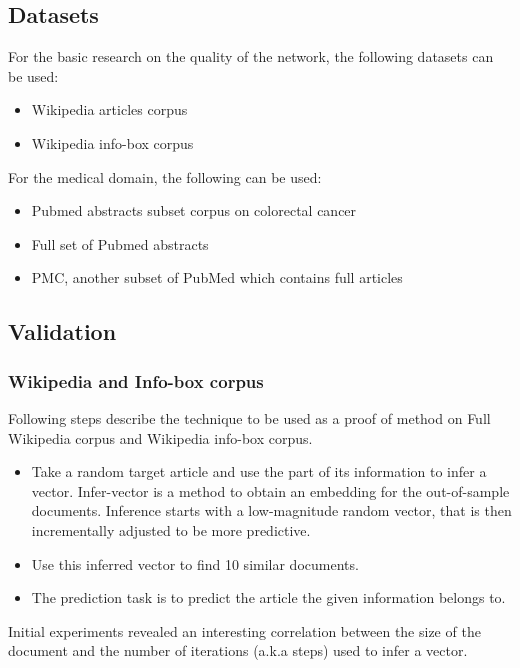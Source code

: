 \documentclass[12pt,a4paper] {article}
\begin{document}
	
	\subsection*{Datasets}
	For the basic research on the quality of the network, the following datasets can 
	be used:
	\begin{itemize}
		\item Wikipedia articles corpus
		\item Wikipedia info-box corpus
	\end{itemize}
	
	For the medical domain, the following can be used:
	\begin{itemize}
		\item Pubmed abstracts subset corpus on colorectal cancer
		\item Full set of Pubmed abstracts
		\item PMC, another subset of PubMed which contains full articles
	\end{itemize}
	
	
	\subsection*{Validation}
	
	\subsubsection*{Wikipedia and Info-box corpus}
	Following steps describe the technique to be used as a proof of method on Full Wikipedia corpus and Wikipedia info-box corpus. 
	
	\begin{itemize}
		
		
		
		\item Take a random target article and use the part of its information to infer a vector. Infer-vector is a method to obtain an embedding for the out-of-sample documents. Inference starts with a low-magnitude random vector, that is then incrementally adjusted to be more predictive.
		
		\item Use this inferred vector to find 10 similar documents.
		\item The prediction task is to predict the article the given information belongs to.
		
	\end{itemize}
	
	
	Initial experiments revealed an interesting correlation between the size of the document and the number of iterations (a.k.a steps)  used to infer a vector.
	
\end{document}
